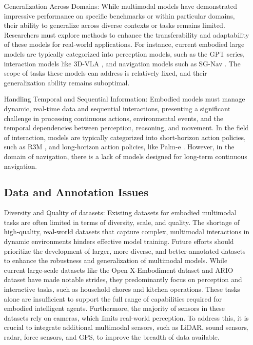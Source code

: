 Generalization Across Domains: While multimodal models have demonstrated impressive performance on specific benchmarks or within particular domains, their ability to generalize across diverse contexts or tasks remains limited. Researchers must explore methods to enhance the transferability and adaptability of these models for real-world applications. For instance, current embodied large models are typically categorized into perception models, such as the GPT series, interaction models like 3D-VLA \cite{zhen20243d}, and navigation models such as SG-Nav \cite{yin2024sg}. The scope of tasks these models can address is relatively fixed, and their generalization ability remains suboptimal.

Handling Temporal and Sequential Information: Embodied models must manage dynamic, real-time data and sequential interactions, presenting a significant challenge in processing continuous actions, environmental events, and the temporal dependencies between perception, reasoning, and movement. In the field of interaction, models are typically categorized into short-horizon action policies, such as R3M \cite{R3M}, and long-horizon action policies, like Palm-e \cite{driess2023palm}. However, in the domain of navigation, there is a lack of models designed for long-term continuous navigation.

\subsection{Data and Annotation Issues}
Diversity and Quality of datasets: Existing datasets for embodied multimodal tasks are often limited in terms of diversity, scale, and quality. The shortage of high-quality, real-world datasets that capture complex, multimodal interactions in dynamic environments hinders effective model training. Future efforts should prioritize the development of larger, more diverse, and better-annotated datasets to enhance the robustness and generalization of multimodal models. While current large-scale datasets like the Open X-Embodiment dataset \cite{o2024open} and ARIO dataset \cite{wang2024all} have made notable strides, they predominantly focus on perception and interactive tasks, such as household chores and kitchen operations. These tasks alone are insufficient to support the full range of capabilities required for embodied intelligent agents. Furthermore, the majority of sensors in these datasets rely on cameras, which limits real-world perception. To address this, it is crucial to integrate additional multimodal sensors, such as LiDAR, sound sensors, radar, force sensors, and GPS, to improve the breadth of data available.

